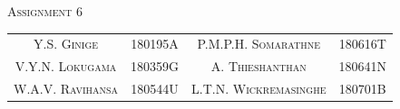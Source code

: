 \documentclass[a4paper, 12pt]{article}
\begin{document}
\begin{flushleft}
     \textsc{\Huge {Assignment 6 \\}}
\end{flushleft}


\begin{center}
\begin{tabular}{c c c c}
     \textsc{Y.S. Ginige} & 180195A &  \textsc{P.M.P.H. Somarathne} & 180616T\\
     \textsc{V.Y.N. Lokugama }& 180359G & \textsc{A. Thieshanthan} &  180641N\\
       \textsc{W.A.V. Ravihansa} &  180544U &  \textsc{L.T.N. Wickremasinghe} & 180701B
\end{tabular}
\end{center}



\normalsize
\end{document}
